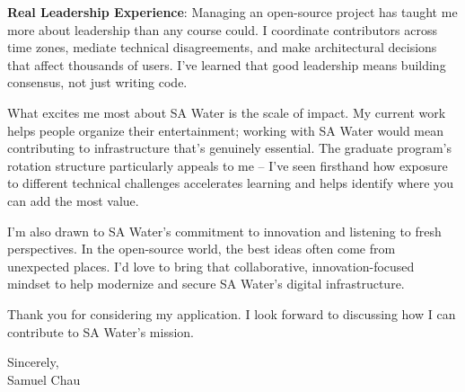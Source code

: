 \documentclass[11pt,a4paper]{article}
\begin{document}
\textbf{Real Leadership Experience}: Managing an open-source project has taught me more about leadership than any course could. I coordinate contributors across time zones, mediate technical disagreements, and make architectural decisions that affect thousands of users. I've learned that good leadership means building consensus, not just writing code.

What excites me most about SA Water is the scale of impact. My current work helps people organize their entertainment; working with SA Water would mean contributing to infrastructure that's genuinely essential. The graduate program's rotation structure particularly appeals to me – I've seen firsthand how exposure to different technical challenges accelerates learning and helps identify where you can add the most value.

I'm also drawn to SA Water's commitment to innovation and listening to fresh perspectives. In the open-source world, the best ideas often come from unexpected places. I'd love to bring that collaborative, innovation-focused mindset to help modernize and secure SA Water's digital infrastructure.

Thank you for considering my application. I look forward to discussing how I can contribute to SA Water's mission.

\vspace{20pt}
\noindent
Sincerely,\\
Samuel Chau
\end{document}
